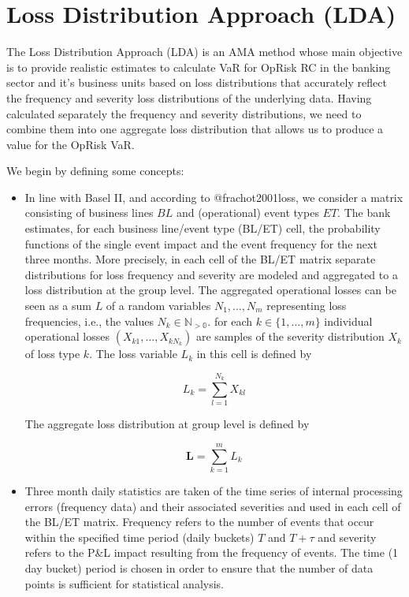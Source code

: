 \documentclass{DissertateUSU}
\begin{document}
\section{Loss Distribution Approach (LDA)}
\label{sec:Loss Distribution Approach (LDA)}

The Loss Distribution Approach (LDA) is an AMA method whose main
objective is to provide realistic estimates to calculate VaR for OpRisk
RC in the banking sector and it's business units based on loss
distributions that accurately reflect the frequency and severity loss
distributions of the underlying data. Having calculated separately the
frequency and severity distributions, we need to combine them into one
aggregate loss distribution that allows us to produce a value for the
OpRisk VaR. \medskip

We begin by defining some concepts:

\begin{itemize}
\item In line with Basel II, and according to @frachot2001loss, we consider a matrix consisting of business lines $BL$ and (operational) event types $ET$. The bank estimates, for each business line/event type (BL/ET) cell, the probability functions of the single event impact and the event frequency for the next three months. More precisely, in each cell of the BL/ET matrix separate distributions for loss frequency and severity are modeled and aggregated to a loss distribution at the group level. The aggregated operational losses can be seen as a sum $L$ of a random variables $N_1,\ldots,N_m$ representing loss frequencies, i.e., the values $N_k \in \mathbb{N_{>0}}$. for each $k \in \{1,\ldots,m\}$ individual operational losses \begin{math} (X_{k1}, \ldots, X_{kN_k})\end{math} are samples of the severity distribution $X_k$ of loss type $k$. The loss variable $L_k$ in this cell is defined by

\singlespacing
\begin{equation}\label{Lossvar}
L_k = \sum_{l=1}^{N_k}X_{kl} 
\end{equation}
\doublespacing

The aggregate loss distribution at group level is defined by

\singlespacing
\begin{equation}\label{AggLossvar}
\mathbf{L} = \sum_{k=1}^m L_k 
\end{equation}
\doublespacing

\item Three month daily statistics are taken of the time series of internal processing errors (frequency data) and their associated severities and used in each cell of the BL/ET matrix. Frequency refers to the number of events that occur within the specified time period (daily buckets) $T$ and $T + \tau$ and severity refers to the P\&L impact resulting from the frequency of events. The time (1 day bucket) period is chosen in order to ensure that the number of data points is sufficient for statistical analysis.
\end{itemize}
\end{document}
